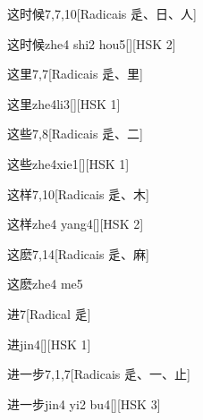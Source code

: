 \begin{entry}{这时候}{7,7,10}[Radicais ⾡、⽇、⼈]
  \begin{phonetics}{这时候}{zhe4 shi2 hou5}[][HSK 2]
  \end{phonetics}
\end{entry}

\begin{entry}{这里}{7,7}[Radicais ⾡、⾥]
  \begin{phonetics}{这里}{zhe4li3}[][HSK 1]
  \end{phonetics}
\end{entry}

\begin{entry}{这些}{7,8}[Radicais ⾡、⼆]
  \begin{phonetics}{这些}{zhe4xie1}[][HSK 1]
  \end{phonetics}
\end{entry}

\begin{entry}{这样}{7,10}[Radicais ⾡、⽊]
  \begin{phonetics}{这样}{zhe4 yang4}[][HSK 2]
  \end{phonetics}
\end{entry}

\begin{entry}{这麽}{7,14}[Radicais ⾡、⿇]
  \begin{phonetics}{这麽}{zhe4 me5}
  \end{phonetics}
\end{entry}

\begin{entry}{进}{7}[Radical ⾡]
  \begin{phonetics}{进}{jin4}[][HSK 1]
  \end{phonetics}
\end{entry}

\begin{entry}{进一步}{7,1,7}[Radicais ⾡、⼀、⽌]
  \begin{phonetics}{进一步}{jin4 yi2 bu4}[][HSK 3]
  \end{phonetics}
\end{entry}

